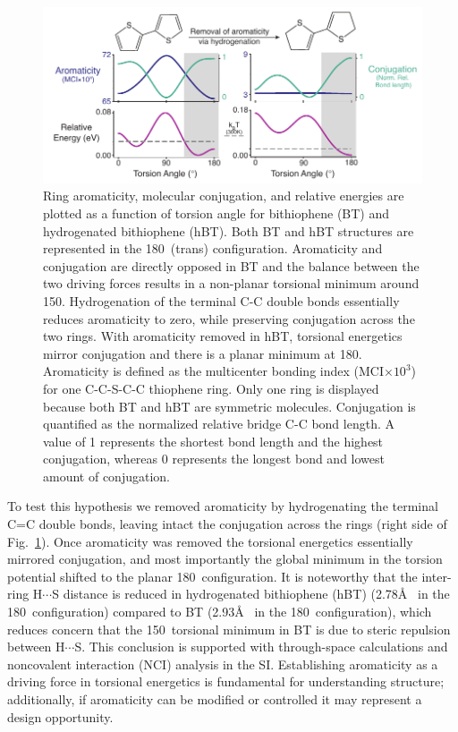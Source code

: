 \begin{figure}[hbt!]
    \centering
    \includegraphics{figures/chap3/fig1_d2.pdf}
    \caption{Ring aromaticity, molecular conjugation, and relative energies are plotted as a function of torsion angle for bithiophene (BT) and hydrogenated bithiophene (hBT). Both BT and hBT structures are represented in the 180\textdegree \ (trans) configuration. Aromaticity and conjugation are directly opposed in BT and the balance between the two driving forces results in a non-planar torsional minimum around 150\textdegree. Hydrogenation of the terminal C-C double bonds essentially reduces aromaticity to zero, while preserving conjugation across the two rings. With aromaticity removed in hBT, torsional energetics mirror conjugation and there is a planar minimum at 180\textdegree. Aromaticity is defined as the multicenter bonding index (MCI$\times 10^3$) for one C-C-S-C-C thiophene ring. Only one ring is displayed because both BT and hBT are symmetric molecules. Conjugation is quantified as the normalized relative bridge C-C bond length. A value of 1 represents the shortest bond length and the highest conjugation, whereas 0 represents the longest bond and lowest amount of conjugation.}
    \label{fig:a_vs_c}
\end{figure}

To test this hypothesis we removed aromaticity by hydrogenating the terminal C=C double bonds, leaving intact the conjugation across the rings (right side of Fig.~\ref{fig:a_vs_c}). Once aromaticity was removed the torsional energetics essentially mirrored conjugation, and most importantly the global minimum in the torsion potential shifted to the planar 180\textdegree \ configuration. It is noteworthy that the inter-ring H$\cdots$S distance is reduced in hydrogenated bithiophene (hBT) (2.78\si{\angstrom} \ in the 180\textdegree \ configuration) compared to BT (2.93\si{\angstrom} \ in the 180\textdegree \ configuration), which reduces concern that the 150\textdegree \ torsional minimum in BT is due to steric repulsion between H$\cdots$S. This conclusion is supported with through-space calculations and noncovalent interaction (NCI) analysis\cite{Johnson2010, Contreras-Garcia2011} in the SI. Establishing aromaticity as a driving force in torsional energetics is fundamental for understanding structure; additionally, if aromaticity can be modified or controlled it may represent a design opportunity.

